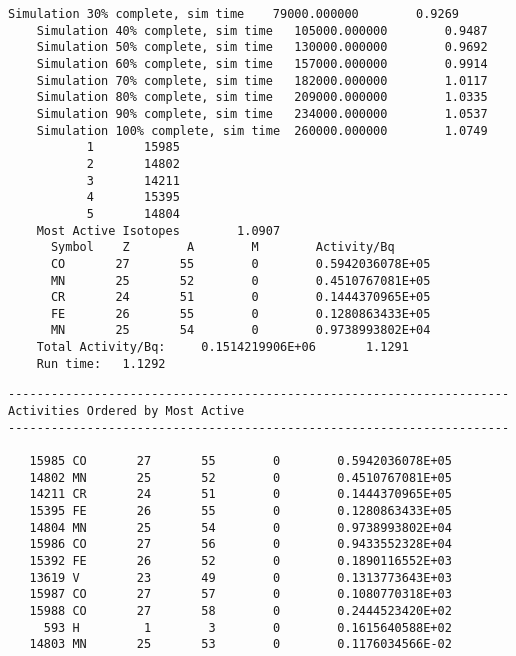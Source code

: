 \begin{lstlisting}[style=sOutputFile,caption={Mailshot Extract}]
    Simulation 30% complete, sim time    79000.000000        0.9269
    Simulation 40% complete, sim time   105000.000000        0.9487
    Simulation 50% complete, sim time   130000.000000        0.9692
    Simulation 60% complete, sim time   157000.000000        0.9914
    Simulation 70% complete, sim time   182000.000000        1.0117
    Simulation 80% complete, sim time   209000.000000        1.0335
    Simulation 90% complete, sim time   234000.000000        1.0537
    Simulation 100% complete, sim time  260000.000000        1.0749
           1       15985
           2       14802
           3       14211
           4       15395
           5       14804
    Most Active Isotopes        1.0907
      Symbol    Z        A        M        Activity/Bq
      CO       27       55        0        0.5942036078E+05
      MN       25       52        0        0.4510767081E+05
      CR       24       51        0        0.1444370965E+05
      FE       26       55        0        0.1280863433E+05
      MN       25       54        0        0.9738993802E+04
    Total Activity/Bq:     0.1514219906E+06       1.1291
    Run time:   1.1292

\end{lstlisting}




\begin{lstlisting}[style=sOutputFile,caption={Mailshot Extract}]
----------------------------------------------------------------------
Activities Ordered by Most Active
----------------------------------------------------------------------
 
   15985 CO       27       55        0        0.5942036078E+05
   14802 MN       25       52        0        0.4510767081E+05
   14211 CR       24       51        0        0.1444370965E+05
   15395 FE       26       55        0        0.1280863433E+05
   14804 MN       25       54        0        0.9738993802E+04
   15986 CO       27       56        0        0.9433552328E+04
   15392 FE       26       52        0        0.1890116552E+03
   13619 V        23       49        0        0.1313773643E+03
   15987 CO       27       57        0        0.1080770318E+03
   15988 CO       27       58        0        0.2444523420E+02
     593 H         1        3        0        0.1615640588E+02
   14803 MN       25       53        0        0.1176034566E-02

\end{lstlisting}






